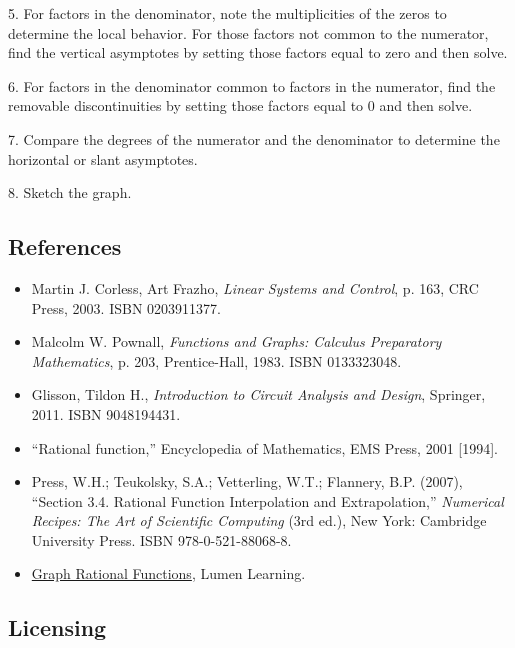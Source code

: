 5. For factors in the denominator, note the multiplicities of the zeros to determine the
local behavior. For those factors not common to the numerator, find the vertical
asymptotes by setting those factors equal to zero and then solve.

6. For factors in the denominator common to factors in the numerator, find the removable discontinuities by setting those factors equal to $0$ and then solve.

7. Compare the degrees of the numerator and the denominator to determine the horizontal or
slant asymptotes.

8. Sketch the graph.

\subsection{References}
\label{sss:refe-44a2}

\begin{itemize}
    \item Martin J. Corless, Art Frazho, \textit{Linear Systems and Control}, p. 163, CRC Press, 2003. ISBN 0203911377.
    \item Malcolm W. Pownall, \textit{Functions and Graphs: Calculus Preparatory Mathematics}, p. 203, Prentice-Hall, 1983. ISBN 0133323048.
    \item Glisson, Tildon H., \textit{Introduction to Circuit Analysis and Design}, Springer, 2011. ISBN 9048194431.
    \item ``Rational function,'' Encyclopedia of Mathematics, EMS Press, 2001 [1994].
    \item Press, W.H.; Teukolsky, S.A.; Vetterling, W.T.; Flannery, B.P. (2007), ``Section 3.4. Rational Function Interpolation and Extrapolation,'' \textit{Numerical Recipes: The Art of Scientific Computing} (3rd ed.), New York: Cambridge University Press. ISBN 978-0-521-88068-8.
    \item \href{https://courses.lumenlearning.com/ivytech-collegealgebra/chapter/graph-rational-functions/}{Graph Rational Functions}, Lumen Learning.
\end{itemize}

\subsection{Licensing}
\label{sss:lice-7352}

